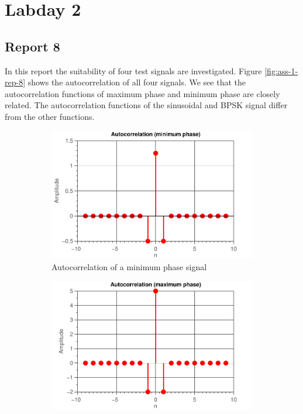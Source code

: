 \documentclass[11pt,titlepage]{report}
\begin{document}
\section{Labday 2}
\subsection{Report 8}
In this report the suitability of four test signals are investigated. Figure \ref{fig:ass-1-rep-8} shows the autocorrelation of all four signals. We see that the autocorrelation functions of maximum phase and minimum phase are closely related. The autocorrelation functions of the sinusoidal and BPSK signal differ from the other functions.

\begin{figure}[H]
	\centering
	\begin{subfigure}{0.49\textwidth}
		\includegraphics[width=\textwidth]{../../deliverable-7-resources/figures/ass-1/report-8-9-10/report-8/ass-1-report-8-minimum-phase-minimum-phase.pdf}
		\caption{Autocorrelation of a minimum phase signal}
	\end{subfigure}
	\begin{subfigure}{0.49\textwidth}
		\includegraphics[width=\textwidth]{../../deliverable-7-resources/figures/ass-1/report-8-9-10/report-8/ass-1-report-8-maximum-phase-maximum-phase.pdf}

\end{subfigure}
\end{figure}
\end{document}
